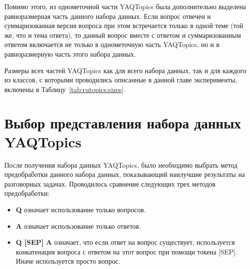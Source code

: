 Помимо этого, из однометочной части {YAQTopics} была дополнительно выделена равноразмерная часть данного набора данных. Если вопрос отвечен и суммаризованная версия вопроса при этом встречается только в одной теме (той же, что и тема ответа), то данный вопрос вместе с ответом и суммаризованным ответом включается не только в однометочную часть {YAQTopics}, но и в равноразмерную часть этого набора данных.
 
Размеры всех частей {YAQTopics} как для всего набора данных, так и для каждого из классов, с которыми проводились описанные в данной главе эксперименты, включены в Таблицу~\ref{tab:rutopics:sizes}.

\begin{table}[t]
\centering
{}
\caption{Размеры набора данных {YAQTopics} по классу и части}
\label{tab:rutopics:sizes}
\end{table}


\section{Выбор представления набора данных {YAQTopics}}\label{rutopics:prepr}

После получения набора данных {YAQTopics}, было необходимо выбрать метод предобработки данного набора данных, показывающий наилучшие результаты на разговорных задачах. Проводилось сравнение следующих трех методов предобработки:

\begin{itemize}
   \item \textbf{Q} означает использование только вопросов.
   \item \textbf{A} означает использование только ответов.
   \item \textbf{Q [SEP] A} означает, что если ответ на вопрос существует, используется конкатенация вопроса с ответом на этот вопрос при помощи токена [SEP]. Иначе используется просто вопрос.  
\end{itemize}

